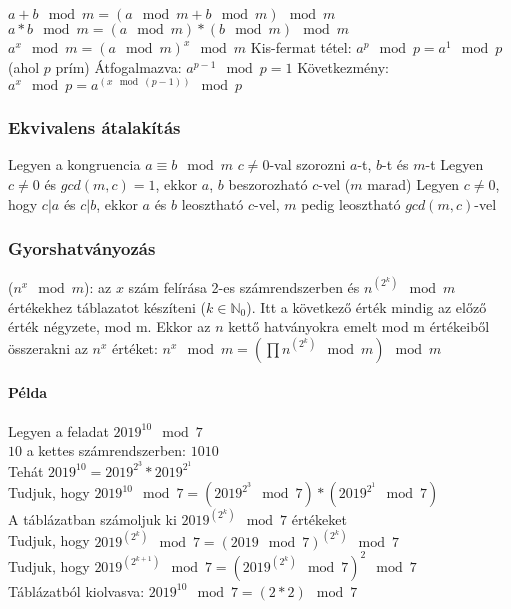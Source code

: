 \documentclass[12pt,a4paper]{article}
\begin{document}
\begin{outline}
\1 $a+b \mod m = (a \mod m + b \mod m) \mod m$
\1 $a*b \mod m = (a \mod m) * (b \mod m) \mod m$
\1 $a^x \mod m = (a \mod m)^x \mod m$
\1 Kis-fermat tétel: $a^p \mod p = a^1 \mod p$ \;\; (ahol $p$ prím)
\2 Átfogalmazva: $a^{p-1} \mod p = 1$
\2 Következmény: $a^x \mod p = a^{(x \mod (p-1))} \mod p$
\end{outline}

\subsubsection{Ekvivalens átalakítás}

\begin{outline}
	\1 Legyen a kongruencia $a \equiv b \mod m$
	\1 $c \ne 0$-val szorozni $a$-t, $b$-t és $m$-t
	\1 Legyen $c \ne 0$ és $gcd(m,c)=1$, ekkor $a$, $b$ beszorozható $c$-vel ($m$ marad) 
	\1 Legyen $c \ne 0$, hogy $c | a$ és $c | b$, ekkor $a$ és $b$ leosztható $c$-vel, $m$ pedig leosztható $gcd(m,c)$-vel
\end{outline}

\subsubsection{Gyorshatványozás}

($n^x \mod m$):  az $x$ szám felírása 2-es számrendszerben
és $n^{(2^k)} \mod m$ értékekhez táblazatot készíteni ($k \in \mathbb{N}_0$).
Itt a következő érték mindig az előző érték négyzete, mod m.
Ekkor az $n$ kettő hatványokra emelt mod m értékeiből összerakni az $n^x$ értéket:
$n^x \mod m = (\prod n^{(2^k)} \mod m) \mod m$

\paragraph{Példa} Legyen a feladat $2019^{10} \mod 7$ \\
$10$ a kettes számrendszerben: $1010$ \\
Tehát $2019^{10} = 2019^{2^3}*2019^{2^1}$ \\
Tudjuk, hogy $2019^{10} \mod 7 = (2019^{2^3} \mod 7)*(2019^{2^1} \mod 7)$ \\
A táblázatban számoljuk ki $2019^{(2^k)} \mod 7$ értékeket \\
Tudjuk, hogy $2019^{(2^k)} \mod 7 = (2019 \mod 7)^{(2^k)} \mod 7$ \\
Tudjuk, hogy $2019^{(2^{k+1})} \mod 7 = (2019^{(2^k)} \mod 7)^2 \mod 7$ \\
Táblázatból kiolvasva: $2019^{10} \mod 7 = (2*2) \mod 7$
\end{document}
